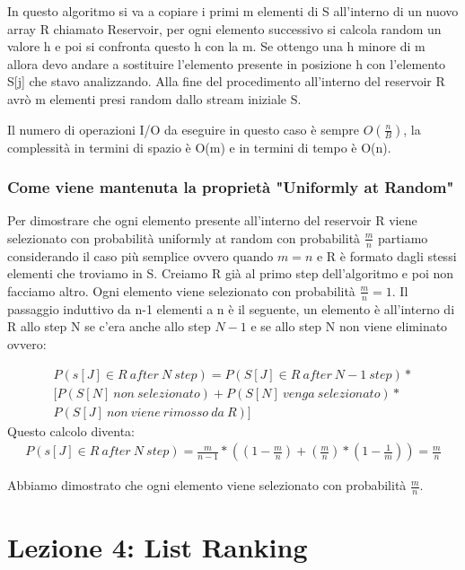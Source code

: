 \documentclass[14pt]{extreport}
\begin{document}
In questo algoritmo si va a copiare i primi m elementi di S all'interno di un nuovo array R chiamato Reservoir, per ogni elemento successivo si calcola random un valore h e poi si confronta questo h con la m.
Se ottengo una h minore di m allora devo andare a sostituire l'elemento presente in posizione h con l'elemento S[j] che stavo analizzando.
Alla fine del procedimento all'interno del reservoir R avrò m elementi presi random dallo stream iniziale S.

Il numero di operazioni I/O da eseguire in questo caso è sempre $O(\frac{n}{B})$, la complessità in termini di spazio è O(m) e in termini di tempo è O(n).


\subsection{Come viene mantenuta la proprietà "Uniformly at Random"}

Per dimostrare che ogni elemento presente all'interno del reservoir R viene selezionato con probabilità uniformly at random con probabilità $\frac{m}{n}$ partiamo considerando il caso più semplice ovvero quando $m=n$ e R è formato dagli stessi elementi che troviamo in S. Creiamo R già al primo step dell'algoritmo e poi non facciamo altro.
Ogni elemento viene selezionato con probabilità $\frac{m}{n} = 1$.
Il passaggio induttivo da n-1 elementi a n è il seguente, un elemento è all'interno di R allo step N se c'era anche allo step $N-1$ e se allo step N non viene eliminato ovvero:

\begin{equation}
\begin{split}
P(s[J] \in R\ after\ N\ step) = P(S[J] \in R\ after\ N-1\ step)* \\ [P(S[N]\ non\ selezionato) + P(S[N]\ venga\ selezionato)*\\
P(S[J]\ non\ viene\ rimosso\ da\ R)]
\end{split}
\end{equation}
Questo calcolo diventa:
\begin{equation}
\begin{split}
P(s[J] \in R\ after\ N\ step) = \frac{m}{n-1} * ((1-\frac{m}{n}) + (\frac{m}{n}) * (1-\frac{1}{m}) ) = \frac{m}{n}
\end{split}
\end{equation}

Abbiamo dimostrato che ogni elemento viene selezionato con probabilità $\frac{m}{n}$.

\chapter{Lezione 4: List Ranking}
\end{document}
